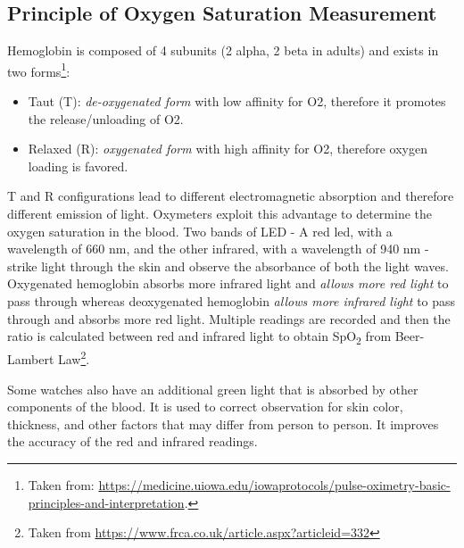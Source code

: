 \documentclass[pdflatex,sn-mathphys]{sn-jnl}%
\theoremstyle{thmstyleone}%
\theoremstyle{thmstyletwo}%
\theoremstyle{thmstylethree}%
\begin{document}
\subsection{Principle of Oxygen Saturation Measurement}
Hemoglobin is composed of 4 subunits (2 alpha, 2 beta in adults) and exists in two forms\footnote{Taken from: \href{https://medicine.uiowa.edu/iowaprotocols/pulse-oximetry-basic-principles-and-interpretation}{https://medicine.uiowa.edu/iowaprotocols/pulse-oximetry-basic-principles-and-interpretation}.}:
\begin{itemize}
    \item Taut (T): \textit{de-oxygenated form} with low affinity for O2, therefore it promotes the release/unloading of O2.
    \item Relaxed (R): \textit{ oxygenated form} with high affinity for O2, therefore oxygen loading is favored.
\end{itemize}
T and R configurations lead to different electromagnetic absorption and therefore different emission of light. Oxymeters exploit this advantage to determine the oxygen saturation in the blood.
Two bands of LED - A red led, with a wavelength of 660 nm, and the other infrared, with a wavelength of 940 nm - strike light through the skin and observe the absorbance of both the light waves. Oxygenated hemoglobin absorbs more infrared light and \textit{allows more red light} to pass through whereas deoxygenated hemoglobin\textit{ allows more infrared light }to pass through and absorbs more red light.
Multiple readings are recorded and then the ratio is calculated between red and infrared light to obtain SpO\textsubscript{2} from Beer-Lambert Law\footnote{Taken from \href{https://www.frca.co.uk/article.aspx?articleid=332}{https://www.frca.co.uk/article.aspx?articleid=332}}.

Some watches also have an additional green light that is absorbed by other components of the blood. It is used to correct observation for skin color, thickness, and other factors that may differ from person to person. It improves the accuracy of the red and infrared readings.
\end{document}
